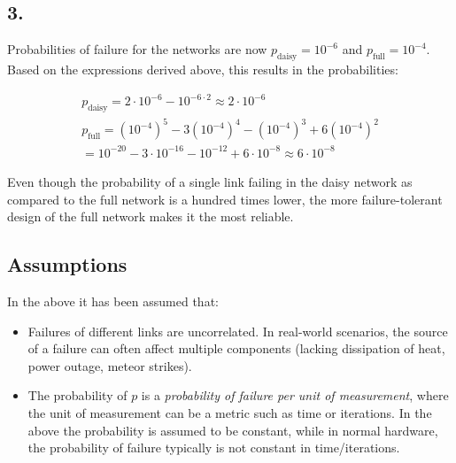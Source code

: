 \documentclass[12pt]{article}
\begin{document}
\subsection*{3.}

Probabilities of failure for the networks are now $p_{\text{daisy}} = 10^{-6}$ and $p_{\text{full}} = 10^{-4}$. \\
Based on the expressions derived above, this results in the probabilities:

\begin{align*}
  p_{\text{daisy}} = 2\cdot10^{-6} - 10^{-6\cdot2} \approx 2\cdot10^{-6} \\
  p_{\text{full}} = (10^{-4})^5 - 3(10^{-4})^4 - (10^{-4})^3 + 6(10^{-4})^2 \\
  = 10^{-20} - 3\cdot10^{-16} - 10^{-12} + 6\cdot10^{-8} \approx 6\cdot10^{-8}
\end{align*}

Even though the probability of a single link failing in the daisy network as compared to the full network is a hundred times lower, the more failure-tolerant design of the full network makes it the most reliable.

\subsection*{Assumptions}

In the above it has been assumed that:
\begin{itemize}
  \item Failures of different links are uncorrelated. In real-world scenarios, the source of a failure can often affect multiple components (lacking dissipation of heat, power outage, meteor strikes).
  \item The probability of $p$ is a \emph{probability of failure per unit of measurement}, where the unit of measurement can be a metric such as time or iterations. In the above the probability is assumed to be constant, while in normal hardware, the probability of failure typically is not constant in time/iterations.
\end{itemize}
\end{document}
